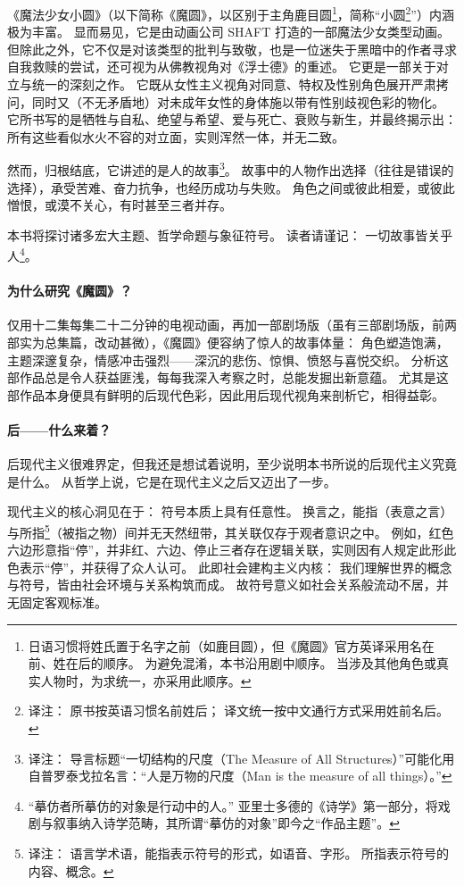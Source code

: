 《魔法少女小圆》（以下简称《魔圆》，以区别于主角鹿目圆\footnote{%
    日语习惯将姓氏置于名字之前（如鹿目圆），但《魔圆》官方英译采用名在前、姓在后的顺序。
    为避免混淆，本书沿用剧中顺序。
    当涉及其他角色或真实人物时，为求统一，亦采用此顺序。
}，简称“小圆\footnote{%
    译注：
    原书按英语习惯名前姓后；
    译文统一按中文通行方式采用姓前名后。
}”）内涵极为丰富。
显而易见，它是由动画公司 SHAFT 打造的一部魔法少女类型动画。
但除此之外，它不仅是对该类型的批判与致敬，也是一位迷失于黑暗中的作者寻求自我救赎的尝试，还可视为从佛教视角对《浮士德》的重述。
它更是一部关于对立与统一的深刻之作。
它既从女性主义视角对同意、特权及性别角色展开严肃拷问，同时又（不无矛盾地）对未成年女性的身体施以带有性别歧视色彩的物化。
它所书写的是牺牲与自私、绝望与希望、爱与死亡、衰败与新生，并最终揭示出：
所有这些看似水火不容的对立面，实则浑然一体，并无二致。

然而，归根结底，它讲述的是人的故事\footnote{%
    译注：
    导言标题“一切结构的尺度（The Measure of All Structures）”可能化用自普罗泰戈拉名言：“人是万物的尺度（Man is the measure of all things）。”
}。
故事中的人物作出选择（往往是错误的选择），承受苦难、奋力抗争，也经历成功与失败。
角色之间或彼此相爱，或彼此憎恨，或漠不关心，有时甚至三者并存。

本书将探讨诸多宏大主题、哲学命题与象征符号。
读者请谨记：
一切故事皆关乎人\footnote{%
    “摹仿者所摹仿的对象是行动中的人。”
    亚里士多德的《诗学》第一部分，将戏剧与叙事纳入诗学范畴，其所谓“摹仿的对象”即今之“作品主题”。
}\cite{aristotle2009poetics}。
\paragraph{为什么研究《魔圆》？}

仅用十二集每集二十二分钟的电视动画，再加一部剧场版（虽有三部剧场版，前两部实为总集篇，改动甚微），《魔圆》便容纳了惊人的故事体量：
角色塑造饱满，主题深邃复杂，情感冲击强烈——深沉的悲伤、惊惧、愤怒与喜悦交织。
分析这部作品总是令人获益匪浅，每每我深入考察之时，总能发掘出新意蕴。
尤其是这部作品本身便具有鲜明的后现代色彩，因此用后现代视角来剖析它，相得益彰。
\paragraph{后——什么来着？}

后现代主义很难界定，但我还是想试着说明，至少说明本书所说的后现代主义究竟是什么。
从哲学上说，它是在现代主义之后又迈出了一步。

现代主义的核心洞见在于：
符号本质上具有任意性。
换言之，能指（表意之言）与所指\footnote{%
    译注：
    语言学术语，能指表示符号的形式，如语音、字形。
    所指表示符号的内容、概念。
}（被指之物）间并无天然纽带，其关联仅存于观者意识之中。
例如，红色六边形意指“停”，并非红、六边、停止三者存在逻辑关联，实则因有人规定此形此色表示“停”，并获得了众人认可。
此即社会建构主义内核：
我们理解世界的概念与符号，皆由社会环境与关系构筑而成。
故符号意义如社会关系般流动不居，并无固定客观标准\cite{burr1995social-constructionism}。

